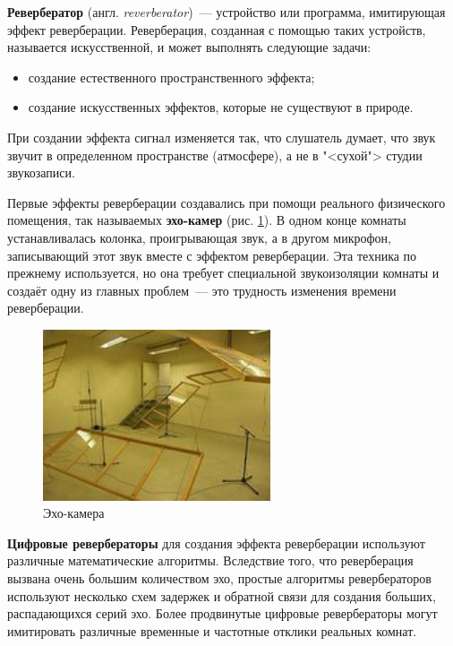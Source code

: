 \documentclass[oneside, final, 14pt]{extreport}
\begin{document}
\textbf{Ревербератор} (англ. \emph{reverberator})~--- устройство или программа, имитирующая эффект реверберации. Реверберация, созданная с помощью таких устройств, называется искусственной, и может выполнять следующие задачи:
\begin{itemize}
  \item создание естественного пространственного эффекта;
  \item создание искусственных эффектов, которые не существуют в природе.
\end{itemize}

При создании эффекта сигнал изменяется так, что слушатель думает, что звук звучит в определенном пространстве (атмосфере), а не в "<сухой"> студии звукозаписи.

Первые эффекты реверберации создавались при помощи реального физического помещения, так называемых \textbf{эхо-камер} (рис. \ref{pic-echochamber-01}). В одном конце комнаты устанавливалась колонка, проигрывающая звук, а в другом микрофон, записывающий этот звук вместе с эффектом реверберации. Эта техника по прежнему используется, но она требует специальной звукоизоляции комнаты и создаёт одну из главных проблем~--- это трудность изменения времени реверберации.

\begin{figure}[h!]
  \centering
  \includegraphics[width=0.6\textwidth]{pic-echochamber-01}
  \caption{Эхо-камера}
  \label{pic-echochamber-01}
\end{figure}

\textbf{Цифровые ревербераторы} для создания эффекта реверберации используют различные математические алгоритмы. Вследствие того, что реверберация вызвана очень большим количеством эхо, простые алгоритмы ревербераторов используют несколько схем задержек и обратной связи для создания больших, распадающихся серий эхо. Более продвинутые цифровые ревербераторы могут имитировать различные временные и частотные отклики реальных комнат.
\end{document}
